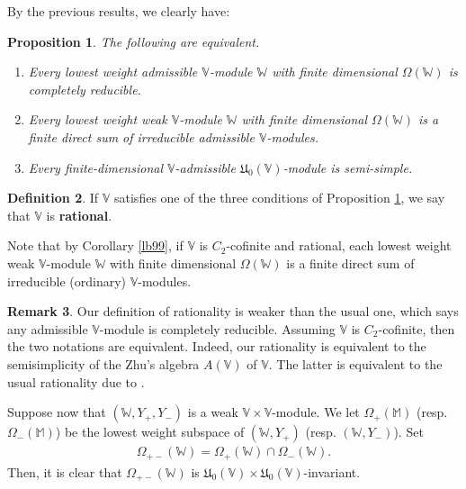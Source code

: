 \documentclass[12pt,a4paper,notitlepage]{report}
\theoremstyle{definition}
\newtheorem{df}{Definition}[section]
\newtheorem{rem}[df]{Remark}
\theoremstyle{plain}
\newtheorem{pp}[df]{Proposition}
\newcommand{\fk}{\mathfrak}
\newcommand{\Vbb}{\mathbb V}
\newcommand{\Wbb}{\mathbb W}
\newcommand{\Mbb}{\mathbb M}
\numberwithin{equation}{section}
\begin{document}
By the previous results, we clearly have:

\begin{pp}\label{lb132}
The following are equivalent.
\begin{enumerate}[label=(\alph*)]
\item Every lowest weight admissible $\Vbb$-module $\Wbb$  with finite dimensional $\Omega(\Wbb)$ is completely reducible.
\item Every lowest weight weak  $\Vbb$-module $\Wbb$  with finite dimensional $\Omega(\Wbb)$ is  a finite direct sum of irreducible admissible $\Vbb$-modules.
\item Every finite-dimensional $\Vbb$-admissible $\fk U_0(\Vbb)$-module is semi-simple.
\end{enumerate}
\end{pp}


\begin{df}\label{lb133}
If $\Vbb$ satisfies one of the three conditions of Proposition \ref{lb132}, we say that $\Vbb$ is \textbf{rational}.
\end{df}




Note that by Corollary \ref{lb99}, if $\Vbb$ is $C_2$-cofinite and rational, each lowest weight weak  $\Vbb$-module $\Wbb$  with finite dimensional $\Omega(\Wbb)$ is a finite direct sum of irreducible (ordinary) $\Vbb$-modules.



\begin{rem}
Our definition of rationality is weaker than the usual one, which says any admissible $\Vbb$-module is completely reducible. Assuming $\Vbb$ is $C_2$-cofinite, then the two notations are equivalent. Indeed, our rationality is equivalent to the semisimplicity of the Zhu's algebra $A(\Vbb)$ of $\Vbb$. The latter is equivalent to the usual rationality due to \cite{McR21}.
\end{rem}






Suppose now that $(\Wbb,Y_+,Y_-)$ is a weak $\Vbb\times\Vbb$-module. We let $\Omega_+(\Mbb)$ (resp. $\Omega_-(\Mbb)$) be the lowest weight subspace of $(\Wbb,Y_+)$ (resp. $(\Wbb,Y_-)$). Set \index{zz@$\Omega(\Wbb),\Omega_{+-}(\Wbb)$}
\begin{align}
\Omega_{+-}(\Wbb)=\Omega_+(\Wbb)\cap \Omega_-(\Wbb).\label{eq207}
\end{align}
Then, it is clear that $\Omega_{+-}(\Wbb)$ is $\fk U_0(\Vbb)\times \fk U_0(\Vbb)$-invariant.
\end{document}
